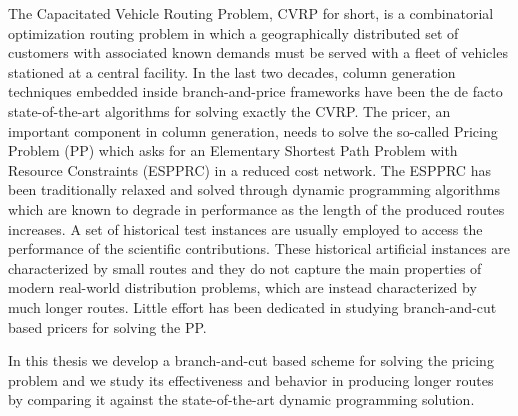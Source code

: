 \noindent The Capacitated Vehicle Routing Problem, CVRP for short,
is a combinatorial optimization routing problem in which
a geographically distributed set of
customers with associated known demands must be served with a fleet of vehicles
stationed at a central facility.
In the last two decades,
column generation techniques embedded inside branch-and-price frameworks
have been the de facto state-of-the-art algorithms
for solving exactly the CVRP.
The pricer, an important component in column generation, needs to solve
the so-called Pricing Problem (PP) which asks for an
Elementary Shortest Path Problem with Resource Constraints (ESPPRC)
in a reduced cost network.
The ESPPRC has been traditionally relaxed and solved through dynamic programming
algorithms which are known to degrade in performance as
the length of the produced routes increases.
A set of historical test instances are usually employed to access
the performance of the scientific contributions.
These historical artificial instances are characterized by small routes
and they do not capture the main properties of modern real-world distribution
problems,
which are instead characterized by much longer routes.
Little effort has been dedicated in studying branch-and-cut
based pricers for solving the PP.

\noindent In this thesis we develop
a branch-and-cut based scheme for solving the pricing problem
and we study its effectiveness and behavior in producing longer routes
by comparing it against the state-of-the-art dynamic programming solution.
